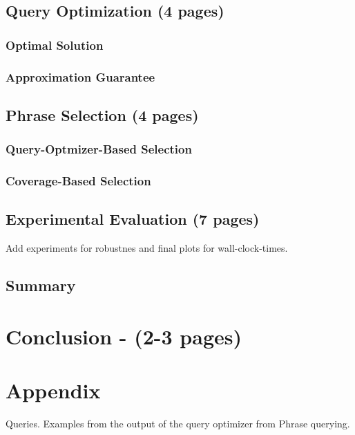 \documentclass[12pt]{article}
\begin{document}
	\subsection{Query Optimization (4 pages)}
		\subsubsection{Optimal Solution}
		\subsubsection{Approximation Guarantee}

	\subsection{Phrase Selection (4 pages)}
		\subsubsection{Query-Optmizer-Based Selection}
		\subsubsection{Coverage-Based Selection}

	\subsection{Experimental Evaluation (7 pages)}
		Add experiments for robustnes and final plots for wall-clock-times.	
	\subsection{Summary}

\section{Conclusion - (2-3 pages)}

\section{Appendix}
	Queries. Examples from the output of the query optimizer from Phrase querying.
\end{document}
